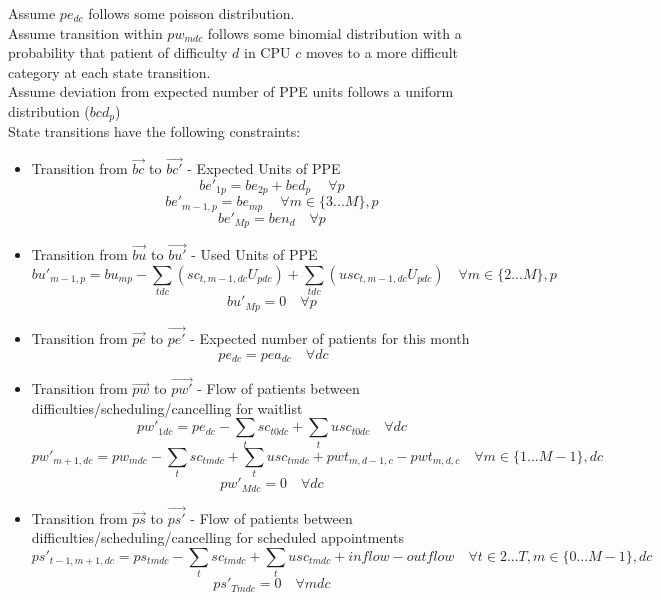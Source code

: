 \documentclass{article}
\begin{document}
Assume $pe_{dc}$ follows some poisson distribution. \\
Assume transition within $pw_{mdc}$ follows some binomial distribution with a probability that patient of difficulty $d$ in CPU $c$ moves to a more difficult category at each state transition. \\
Assume deviation from expected number of PPE units follows a uniform distribution ($bcd_{p}$)\\
State transitions have the following constraints:
\begin{itemize}

	\item Transition from $\vec{bc}$ to $\vec{bc'}$ - Expected Units of PPE
		\[ be'_{1p} = be_{2p} + bed_{p}\ \quad \forall p \]
		\[ be'_{m-1,p} = be_{mp}\ \quad \forall m \in \{3...M\}, p \]
		\[ be'_{Mp} = ben_{d} \quad \forall p \]
	
	\item Transition from $\vec{bu}$ to $\vec{bu'}$ - Used Units of PPE
		\[ bu'_{m-1,p} = bu	_{mp} - \sum_{tdc} ( sc_{t,m-1,dc}U_{pdc} ) + \sum_{tdc} ( usc_{t,m-1,dc}U_{pdc} )  \quad \forall m \in \{2...M\}, p \]
		\[ bu'_{Mp} = 0 \quad \forall p \]

	\item Transition from $\vec{pe}$ to $\vec{pe'}$ - Expected number of patients for this month
		\[\ pe_{dc} = pea_{dc} \quad \forall dc \]

	\item Transition from $\vec{pw}$ to $\vec{pw'}$ - Flow of patients between difficulties/scheduling/cancelling for waitlist
		\[ pw'_{1dc} = pe_{dc} - \sum_{t} sc_{t0dc} + \sum_{t} usc_{t0dc} \quad \forall dc \]
		\[ pw'_{m+1, dc} = pw_{mdc} - \sum_{t} sc_{tmdc} + \sum_{t} usc_{tmdc} + pwt_{m,d-1,c} - pwt_{m,d,c} \quad \forall m \in \{1...M-1 \}, dc \]
		\[ pw'_{Mdc} = 0 \quad \forall dc \]

	\item Transition from $\vec{ps}$ to $\vec{ps'}$ - Flow of patients between difficulties/scheduling/cancelling for scheduled appointments
		\[ ps'_{t-1,m+1,dc} = ps_{tmdc} - \sum_{t} sc_{tmdc} + \sum_{t} usc_{tmdc} + inflow - outflow \quad \forall t \in {2 ... T},  m \in \{0... M-1 \}, dc \]
		\[ ps'_{Tmdc} = 0 \quad \forall mdc \]

\end{itemize}
    
\end{document}
